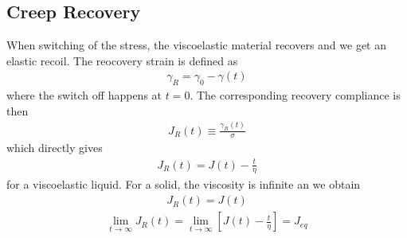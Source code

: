 \documentclass[letterpaper,10pt,english]{sphinxmanual}
\begin{document}
\subsection{Creep Recovery}
\label{\detokenize{notebooks/L24/1_Viscoelasticity:Creep-Recovery}}
\sphinxAtStartPar
When switching of the stress, the viscoelastic material recovers and we get an elastic recoil. The reocovery strain is defined as
\begin{equation*}
\begin{split}\gamma_R =\gamma_0-\gamma(t)\end{split}
\end{equation*}
\sphinxAtStartPar
where the switch off happens at \(t=0\). The corresponding recovery compliance is then
\begin{equation*}
\begin{split}J_R(t)\equiv\frac{\gamma_R(t)}{\sigma}\end{split}
\end{equation*}
\sphinxAtStartPar
which directly gives
\begin{equation*}
\begin{split}J_R(t)=J(t)-\frac{t}{\eta}\end{split}
\end{equation*}
\sphinxAtStartPar
for a viscoelastic liquid. For a solid, the viscosity is infinite an we obtain
\begin{equation*}
\begin{split}J_R(t)=J(t)\end{split}
\end{equation*}\begin{equation*}
\begin{split}\lim_{t\rightarrow\infty} J_R(t)=\lim_{t\rightarrow \infty}\left [ J(t)-\frac{t}{\eta}\right ]=J_{eq}\end{split}
\end{equation*}
\end{document}
